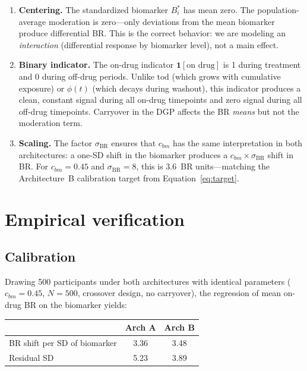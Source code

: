 \documentclass[11pt]{article}
\begin{document}
\begin{enumerate}[leftmargin=2em]

\item \textbf{Centering.} The standardized biomarker
  $B_i^{*}$ has mean zero. The population-average moderation
  is zero---only deviations from the mean biomarker produce
  differential BR. This is the correct behavior: we are
  modeling an \emph{interaction} (differential response by
  biomarker level), not a main effect.

\item \textbf{Binary indicator.} The on-drug indicator
  $\mathbf{1}[\text{on drug}]$ is 1 during treatment and 0
  during off-drug periods. Unlike $\text{tod}$ (which grows
  with cumulative exposure) or $\phi(t)$ (which decays during
  washout), this indicator produces a clean, constant signal
  during all on-drug timepoints and zero signal during all
  off-drug timepoints. Carryover in the DGP affects the BR
  \emph{means} but not the moderation term.

\item \textbf{Scaling.} The factor $\sigma_{\text{BR}}$
  ensures that $c_{bm}$ has the same interpretation in both
  architectures: a one-SD shift in the biomarker produces a
  $c_{bm} \times \sigma_{\text{BR}}$ shift in BR. For
  $c_{bm} = 0.45$ and $\sigma_{\text{BR}} = 8$, this is
  3.6~BR units---matching the Architecture~B calibration
  target from Equation~\ref{eq:target}.

\end{enumerate}

\section{Empirical verification}

\subsection{Calibration}

Drawing 500 participants under both architectures with
identical parameters ($c_{bm} = 0.45$, $N = 500$, crossover
design, no carryover), the regression of mean on-drug BR on
the biomarker yields:

\begin{center}
\begin{tabular}{lcc}
\toprule
& \textbf{Arch A} & \textbf{Arch B} \\
\midrule
BR shift per SD of biomarker & 3.36 & 3.48 \\
Residual SD & 5.23 & 3.89 \\
\bottomrule
\end{tabular}
\end{center}
\end{document}
